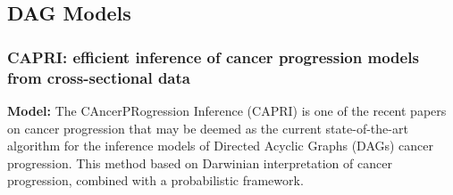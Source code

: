 
\subsection{DAG Models}
	\subsubsection{CAPRI: efficient inference of cancer progression
models from cross-sectional data \cite{Ramazzotti2015}}
	{\bf Model:}
	The CAncerPRogression Inference (CAPRI) \cite{Ramazzotti2015} is one of the recent papers on cancer progression that may be deemed as the current state-of-the-art algorithm for the inference models of Directed Acyclic Graphs (DAGs) cancer progression. This method based on Darwinian interpretation of cancer progression, combined with a probabilistic framework. 
	

